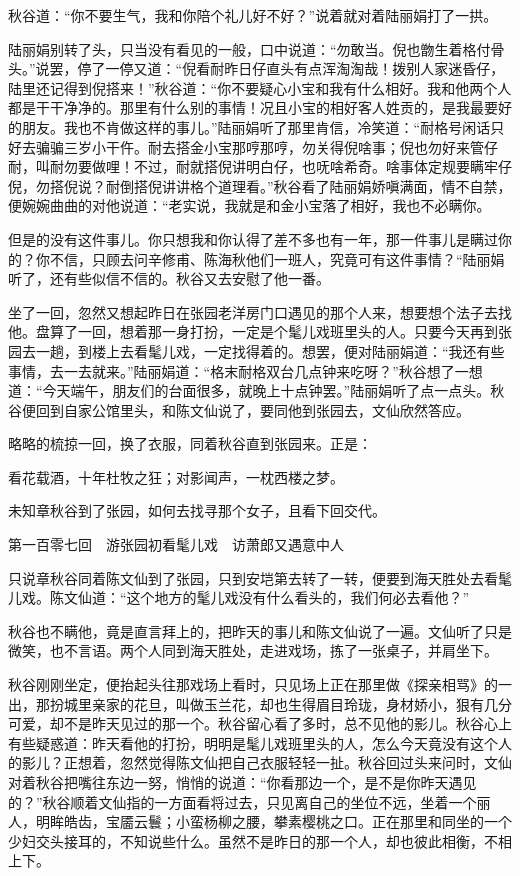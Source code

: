 \documentclass[12pt,UTF8]{ctexbook}
\begin{document}
{{{秋谷道：“你不要生气，我和你陪个礼儿好不好？”说着就对着陆丽娟打了一拱。

陆丽娟别转了头，只当没有看见的一般，口中说道：“勿敢当。倪也朆生着格付骨头。”说罢，停了一停又道：“倪看耐昨日仔直头有点浑淘淘哉！拨别人家迷昏仔，陆里还记得到倪搭来！”秋谷道：“你不要疑心小宝和我有什么相好。我和他两个人都是干干净净的。那里有什么别的事情！况且小宝的相好客人姓贡的，是我最要好的朋友。我也不肯做这样的事儿。”陆丽娟听了那里肯信，冷笑道：“耐格号闲话只好去骗骗三岁小干仵。耐去搭金小宝那哼那哼，勿关得倪啥事；倪也勿好来管仔耐，叫耐勿要做哩！不过，耐就搭倪讲明白仔，也呒啥希奇。啥事体定规要瞒牢仔倪，勿搭倪说？耐倒搭倪讲讲格个道理看。”秋谷看了陆丽娟娇嗔满面，情不自禁，便婉婉曲曲的对他说道：“老实说，我就是和金小宝落了相好，我也不必瞒你。

但是的没有这件事儿。你只想我和你认得了差不多也有一年，那一件事儿是瞒过你的？你不信，只顾去问辛修甫、陈海秋他们一班人，究竟可有这件事情？“陆丽娟听了，还有些似信不信的。秋谷又去安慰了他一番。

坐了一回，忽然又想起昨日在张园老洋房门口遇见的那个人来，想要想个法子去找他。盘算了一回，想着那一身打扮，一定是个髦儿戏班里头的人。只要今天再到张园去一趟，到楼上去看髦儿戏，一定找得着的。想罢，便对陆丽娟道：“我还有些事情，去一去就来。”陆丽娟道：“格末耐格双台几点钟来吃呀？”秋谷想了一想道：“今天端午，朋友们的台面很多，就晚上十点钟罢。”陆丽娟听了点一点头。秋谷便回到自家公馆里头，和陈文仙说了，要同他到张园去，文仙欣然答应。

略略的梳掠一回，换了衣服，同着秋谷直到张园来。正是：

看花载酒，十年杜牧之狂；对影闻声，一枕西楼之梦。

未知章秋谷到了张园，如何去找寻那个女子，且看下回交代。





第一百零七回　游张园初看髦儿戏　访萧郎又遇意中人





只说章秋谷同着陈文仙到了张园，只到安垲第去转了一转，便要到海天胜处去看髦儿戏。陈文仙道：“这个地方的髦儿戏没有什么看头的，我们何必去看他？”

秋谷也不瞒他，竟是直言拜上的，把昨天的事儿和陈文仙说了一遍。文仙听了只是微笑，也不言语。两个人同到海天胜处，走进戏场，拣了一张桌子，并肩坐下。

秋谷刚刚坐定，便抬起头往那戏场上看时，只见场上正在那里做《探亲相骂》的一出，那扮城里亲家的花旦，叫做玉兰花，却也生得眉目玲珑，身材娇小，狠有几分可爱，却不是昨天见过的那一个。秋谷留心看了多时，总不见他的影儿。秋谷心上有些疑惑道：昨天看他的打扮，明明是髦儿戏班里头的人，怎么今天竟没有这个人的影儿？正想着，忽然觉得陈文仙把自己衣服轻轻一扯。秋谷回过头来问时，文仙对着秋谷把嘴往东边一努，悄悄的说道：“你看那边一个，是不是你昨天遇见的？”秋谷顺着文仙指的一方面看将过去，只见离自己的坐位不远，坐着一个丽人，明眸皓齿，宝靥云鬟；小蛮杨柳之腰，攀素樱桃之口。正在那里和同坐的一个少妇交头接耳的，不知说些什么。虽然不是昨日的那一个人，却也彼此相衡，不相上下。

}}}
\end{document}

